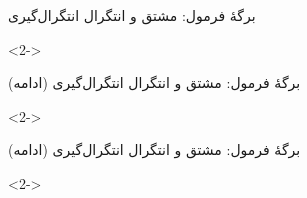 \def\EMtitlesize{26}\def\EMtitleskip{31}
\begin{frame}{برگۀ فرمول: مشتق و انتگرال  انتگرال‌گیری}
\begin{uncoverenv}<2->
\vspace{3bp}
\vspace{3bp}
\vspace{3bp}
\end{uncoverenv}
\end{frame}

\def\EMtitlesize{26}\def\EMtitleskip{31}
\begin{frame}{برگۀ فرمول: مشتق و انتگرال  انتگرال‌گیری (ادامه)}
\begin{uncoverenv}<2->
\vspace{3bp}
\vspace{3bp}
\vspace{3bp}
\vspace{3bp}
\vspace{3bp}
\end{uncoverenv}
\end{frame}

\def\EMtitlesize{26}\def\EMtitleskip{31}
\begin{frame}{برگۀ فرمول: مشتق و انتگرال  انتگرال‌گیری (ادامه)}
\begin{uncoverenv}<2->
\vspace{3bp}
\vspace{3bp}
\vspace{3bp}
\end{uncoverenv}
\end{frame}

